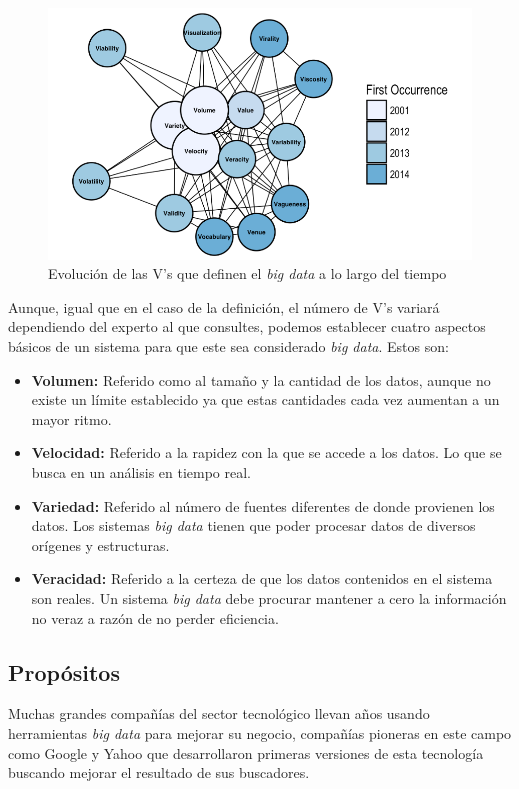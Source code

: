 \begin{figure}[htp!]
	\centering
	\caption{Evolución de las V's que definen el \textit{big data} a lo largo del tiempo \cite{fotoV}}
	\label{lasv}
	\vspace{5pt}
	\includegraphics[scale=0.5]{graphics/lasv}
\end{figure}

Aunque, igual que en el caso de la definición, el número de V's variará dependiendo del experto al que consultes, podemos establecer cuatro aspectos básicos de un sistema para que este sea considerado \textit{big data}. Estos son:

\begin{itemize}
\item \textbf{Volumen:} Referido como al tamaño y la cantidad de los datos, aunque no existe un límite establecido ya que estas cantidades cada vez aumentan a un mayor ritmo.
\item \textbf{Velocidad:} Referido a la rapidez con la que se accede a los datos. Lo que se busca en un análisis en tiempo real.
\item \textbf{Variedad:} Referido al número de fuentes diferentes de donde provienen los datos. Los sistemas \textit{big data} tienen que poder procesar datos de diversos orígenes y estructuras.
\item \textbf{Veracidad:} Referido a la certeza de que los datos contenidos en el sistema son reales. Un sistema \textit{big data} debe procurar mantener a cero la información no veraz a razón de no perder eficiencia.
\end{itemize}

\subsection{Propósitos}
Muchas grandes compañías del sector tecnológico llevan años usando herramientas \textit{big data} para mejorar su negocio, compañías pioneras en este campo como Google y Yahoo que desarrollaron primeras versiones de esta tecnología buscando mejorar el resultado de sus buscadores.

